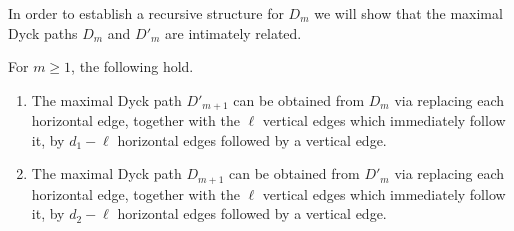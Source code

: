 \documentclass[ALCO,ThmDefs,Unicode,epreuves]{cedram}
\begin{document}
In order to establish a recursive structure for $D_m$ we will show that the maximal Dyck paths $D_m$ and $D'_m$ are intimately related.
\begin{lemma}
 \label{le:Dyck path recursion}
 For $m\ge1$, the following hold.
 \begin{enumerate}[label=(\alph*)]
 \item\label{lemma2.3_1} The maximal Dyck path $D'_{m+1}$ can be obtained from $D_m$ via replacing each horizontal edge, together with the $\ell$ vertical edges which immediately follow it, by $d_1-\ell$ horizontal edges followed by a vertical edge.
 \item\label{lemma2.3_2} The maximal Dyck path $D_{m+1}$ can be obtained from $D'_m$ via replacing each horizontal edge, together with the $\ell$ vertical edges which immediately follow it, by $d_2-\ell$ horizontal edges followed by a vertical edge.
 \end{enumerate}
\end{lemma}
\end{document}
